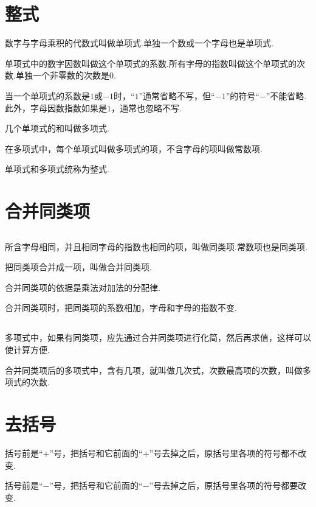 \documentclass[fontset=windows]{ctexrep}
\begin{document}
\subsection{}
\section{整式}
\par 数字与字母乘积的代数式叫做{\heiti 单项式}.单独一个数或一个字母也是单项式.
\par 单项式中的数字因数叫做这个{\heiti 单项式的系数}.所有字母的指数叫做这个{\heiti 单项式的次数}.单独一个非零数的次数是$0$.
\par 当一个单项式的系数是$1$或$-1$时，“$1$”通常省略不写，但“$-1$”的符号“$-$”不能省略.此外，字母因数指数如果是$1$，通常也忽略不写.
\par 几个单项式的和叫做{\heiti 多项式}.
\par 在多项式中，每个单项式叫做{\heiti 多项式的项}，不含字母的项叫做{\heiti 常数项}.
\par 单项式和多项式统称为{\heiti 整式}.
\section{合并同类项}
\subsection{}
\par 所含字母相同，并且相同字母的指数也相同的项，叫做{\heiti 同类项}.常数项也是同类项.
\par 把同类项合并成一项，叫做{\heiti 合并同类项}.
\par 合并同类项的依据是乘法对加法的分配律.
\par 合并同类项时，把同类项的系数相加，字母和字母的指数不变.
\subsection{}
\par 多项式中，如果有同类项，应先通过合并同类项进行化简，然后再求值，这样可以使计算方便.
\par 合并同类项后的多项式中，含有几项，就叫做几次式，次数最高项的次数，叫做{\heiti 多项式的次数}.
\section{去括号}
\par 括号前是“$+$”号，把括号和它前面的“$+$”号去掉之后，原括号里各项的符号都不改变.
\par 括号前是“$-$”号，把括号和它前面的“$-$”号去掉之后，原括号里各项的符号都要改变.
\end{document}
